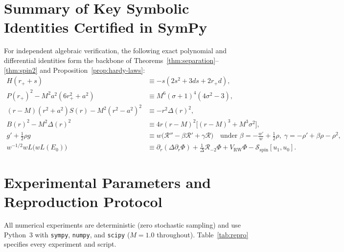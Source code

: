 \documentclass[11pt, a4paper]{article}
\theoremstyle{remark}
\begin{document}
\appendix
\section{Summary of Key Symbolic Identities Certified in SymPy}
\label{app:identities}

For independent algebraic verification, the following exact polynomial and differential identities form the backbone of Theorems~\ref{thm:separation}--\ref{thm:spin2} and Proposition~\ref{prop:hardy-laws}:
\begin{align}
H(r_+ + s) &\equiv -s(2s^2 + 3ds + 2r_+ d), \\
P(r_+)^2 - M^2 a^2(6r_+^2 + a^2) &\equiv M^6(\sigma + 1)^4(4\sigma^2 - 3), \\
(r - M)(r^2 + a^2)S(r) - M^2(r^2 - a^2)^2 &\equiv -r^2\Delta(r)^2, \\
B(r)^2 - M^2\Delta(r)^2 &\equiv 4r(r - M)^2\big[(r - M)^3 + M^3\sigma^2\big], \\
g' + \frac{1}{2}\rho g &\equiv w\big(\mathcal{R}'' - \beta\mathcal{R}' + \gamma\mathcal{R}\big) \quad \text{under } \beta = -\frac{w'}{w} + \frac{1}{2}\rho,\; \gamma = -\rho' + \beta\rho - \rho^2, \\
w^{-1/2}wL\big(wL(E_0)\big) &\equiv \partial_r(\Delta\partial_r\Phi) + \frac{1}{\Delta}\mathcal{R}_{-2}\Phi + V_{\mathrm{RW}}\Phi - \mathcal{S}_{\mathrm{spin}}[u_1, u_0].
\end{align}

\section{Experimental Parameters and Reproduction Protocol}
\label{app:reproduction}

All numerical experiments are deterministic (zero stochastic sampling) and use Python~3 with \texttt{sympy}, \texttt{numpy}, and \texttt{scipy} ($M = 1.0$ throughout). Table~\ref{tab:repro} specifies every experiment and script.
\end{document}
